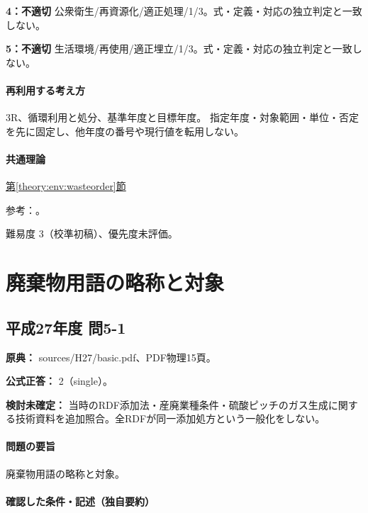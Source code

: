 \noindent\textbf{4：不適切} 公衆衛生/再資源化/適正処理/1/3。式・定義・対応の独立判定と一致しない。\par

\noindent\textbf{5：不適切} 生活環境/再使用/適正埋立/1/3。式・定義・対応の独立判定と一致しない。\par

\paragraph{再利用する考え方} 3R、循環利用と処分、基準年度と目標年度。 指定年度・対象範囲・単位・否定を先に固定し、他年度の番号や現行値を転用しない。

\paragraph{共通理論} \hyperref[theory:env:wasteorder]{第\ref*{theory:env:wasteorder}節}

\par 参考：\cite{env_circular_law,env58_wastegoal}。

\par 難易度 3（校準初稿）、優先度未評価。

\section{廃棄物用語の略称と対象}

\subsection{平成27年度 問5-1}
\label{q:h27-reg-basic-5-1}

\noindent\textbf{原典：} sources/H27/basic.pdf、PDF物理15頁。

\textbf{公式正答：} 2（single）。

\par\textbf{検討未確定：} 当時のRDF添加法・産廃業種条件・硫酸ピッチのガス生成に関する技術資料を追加照合。全RDFが同一添加処方という一般化をしない。

\paragraph{問題の要旨} 廃棄物用語の略称と対象。

\paragraph{確認した条件・記述（独自要約）}\mbox{}\par

